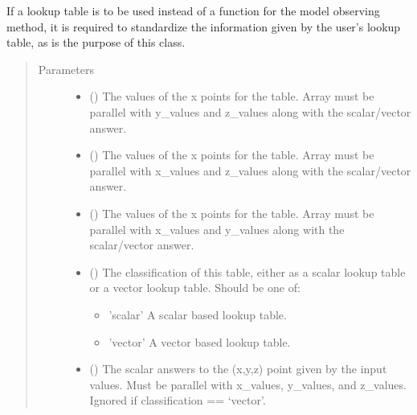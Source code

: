 \documentclass[letterpaper,10pt,english]{sphinxmanual}
\begin{document}
\begin{fulllineitems}
\begin{fulllineitems}
If a lookup table is to be used instead of a function for the model
observing method, it is required to standardize the information given
by the user’s lookup table, as is the purpose of this class.
\begin{quote}\begin{description}
\item[{Parameters}] \leavevmode\begin{itemize}
\item {} 
 () \textendash{} The values of the x points for the table. Array must be parallel
with y\_values and z\_values along with the scalar/vector answer.

\item {} 
 () \textendash{} The values of the x points for the table. Array must be parallel
with x\_values and z\_values along with the scalar/vector answer.

\item {} 
 () \textendash{} The values of the x points for the table. Array must be parallel
with x\_values and y\_values along with the scalar/vector answer.

\item {} 
 () \textendash{} 
The classification of this table, either as a scalar lookup table
or a vector lookup table. Should be one of:
\begin{itemize}
\item {} 
’scalar’   A scalar based lookup table.

\item {} 
’vector’   A vector based lookup table.

\end{itemize}


\item {} 
 (\sphinxstyleliteralemphasis{\sphinxupquote{, }}) \textendash{} The scalar answers to the (x,y,z) point given by the input values.
Must be parallel with x\_values, y\_values, and z\_values. Ignored if
classification == ‘vector’.


\end{itemize}
\end{description}
\end{quote}
\end{fulllineitems}
\end{fulllineitems}
\end{document}
